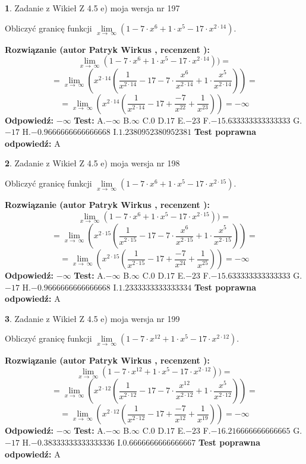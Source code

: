 \documentclass[12pt, a4paper]{article}
\theoremstyle{definition} %
\newtheorem{zad}{}
\newcommand{\zadStart}[1]{\begin{zad}#1\newline}
\newcommand{\zadStop}{\end{zad}}
\newcommand{\rozwStart}[2]{\noindent \textbf{Rozwiązanie (autor #1 , recenzent #2): }\newline}
\newcommand{\rozwStop}{\newline}
\newcommand{\odpStart}{\noindent \textbf{Odpowiedź:}\newline}
\newcommand{\odpStop}{\newline}
\newcommand{\testStart}{\noindent \textbf{Test:}\newline}
\newcommand{\testStop}{\newline}
\newcommand{\kluczStart}{\noindent \textbf{Test poprawna odpowiedź:}\newline}
\newcommand{\kluczStop}{\newline}
\begin{document}
\zadStart{Zadanie z Wikieł Z 4.5 e) moja wersja nr 197}


Obliczyć granicę funkcji  $\lim\limits_{x\to\ \infty}(1 - 7 \cdot x^{6}+1 \cdot x^{5}- 17 \cdot x^{2\cdot14})$.
\zadStop
\rozwStart{Patryk Wirkus}{}
$$\lim\limits_{x\to\ \infty}(1 - 7 \cdot x^{6}+1 \cdot x^{5}- 17 \cdot x^{2\cdot14}))=$$
$$=\lim\limits_{x\to\ \infty}(x^{2\cdot14}(\frac{1}{x^{2\cdot14}}-17 -7 \cdot \frac{x^{6}}{x^{2\cdot14}}+1 \cdot \frac{x^{5}}{x^{2\cdot14}}))=$$
$$=\lim\limits_{x\to\ \infty}(x^{2\cdot14}(\frac{1}{x^{2\cdot14}}-17 + \frac{-7}{x^{22}}+ \frac{1}{x^{23}}))=-\infty$$
\rozwStop
\odpStart
$-\infty$
\odpStop
\testStart
A.$-\infty$ B.$\infty$ C.$0$ D.$17$ E.$-23$
F.$-15.633333333333333$ G.$-17$
H.$-0.9666666666666668$
I.$1.2380952380952381$
\testStop
\kluczStart
A
\kluczStop



\zadStart{Zadanie z Wikieł Z 4.5 e) moja wersja nr 198}


Obliczyć granicę funkcji  $\lim\limits_{x\to\ \infty}(1 - 7 \cdot x^{6}+1 \cdot x^{5}- 17 \cdot x^{2\cdot15})$.
\zadStop
\rozwStart{Patryk Wirkus}{}
$$\lim\limits_{x\to\ \infty}(1 - 7 \cdot x^{6}+1 \cdot x^{5}- 17 \cdot x^{2\cdot15}))=$$
$$=\lim\limits_{x\to\ \infty}(x^{2\cdot15}(\frac{1}{x^{2\cdot15}}-17 -7 \cdot \frac{x^{6}}{x^{2\cdot15}}+1 \cdot \frac{x^{5}}{x^{2\cdot15}}))=$$
$$=\lim\limits_{x\to\ \infty}(x^{2\cdot15}(\frac{1}{x^{2\cdot15}}-17 + \frac{-7}{x^{24}}+ \frac{1}{x^{25}}))=-\infty$$
\rozwStop
\odpStart
$-\infty$
\odpStop
\testStart
A.$-\infty$ B.$\infty$ C.$0$ D.$17$ E.$-23$
F.$-15.633333333333333$ G.$-17$
H.$-0.9666666666666668$
I.$1.2333333333333334$
\testStop
\kluczStart
A
\kluczStop



\zadStart{Zadanie z Wikieł Z 4.5 e) moja wersja nr 199}


Obliczyć granicę funkcji  $\lim\limits_{x\to\ \infty}(1 - 7 \cdot x^{12}+1 \cdot x^{5}- 17 \cdot x^{2\cdot12})$.
\zadStop
\rozwStart{Patryk Wirkus}{}
$$\lim\limits_{x\to\ \infty}(1 - 7 \cdot x^{12}+1 \cdot x^{5}- 17 \cdot x^{2\cdot12}))=$$
$$=\lim\limits_{x\to\ \infty}(x^{2\cdot12}(\frac{1}{x^{2\cdot12}}-17 -7 \cdot \frac{x^{12}}{x^{2\cdot12}}+1 \cdot \frac{x^{5}}{x^{2\cdot12}}))=$$
$$=\lim\limits_{x\to\ \infty}(x^{2\cdot12}(\frac{1}{x^{2\cdot12}}-17 + \frac{-7}{x^{12}}+ \frac{1}{x^{19}}))=-\infty$$
\rozwStop
\odpStart
$-\infty$
\odpStop
\testStart
A.$-\infty$ B.$\infty$ C.$0$ D.$17$ E.$-23$
F.$-16.216666666666665$ G.$-17$
H.$-0.38333333333333336$
I.$0.6666666666666667$
\testStop
\kluczStart
A
\kluczStop
\end{document}
